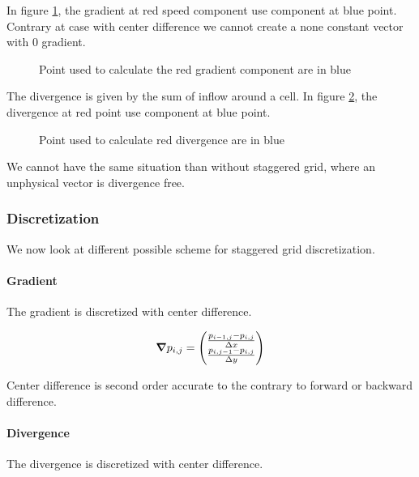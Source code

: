 In figure \ref{fixed:staggered_gradient}, the gradient at red speed component use component at blue point.
Contrary at case with center difference we cannot create a none constant vector with 0 gradient.

\begin{figure}
\caption{Point used to calculate the red gradient component are in blue}
\label{fixed:staggered_gradient}
\end{figure}

The divergence is given by the sum of inflow around a cell.
In figure \ref{fixed:staggered_divergence}, the divergence at red point use component at blue point.

\begin{figure}
\caption{Point used to calculate red divergence are in blue}
\label{fixed:staggered_divergence}
\end{figure}

We cannot have the same situation than without staggered grid, where an unphysical vector is divergence free.

\subsubsection{Discretization}

We now look at different possible scheme for staggered grid discretization.

\paragraph{Gradient}
The gradient is discretized with center difference.

\begin{equation}
  {\boldsymbol {\nabla}}p_{i,j}=\begin{pmatrix}
                       	\frac{p_{i-1,j}-p_{i,j}}{\Delta x}\\
                       	\frac{p_{i,j-1}-p_{i,j}}{\Delta y}\\
                       \end{pmatrix}
\end{equation}

Center difference is second order accurate to the contrary to forward or backward difference.

\paragraph{Divergence}
The divergence is discretized with center difference.

